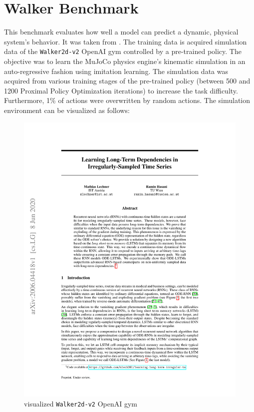 \documentclass[draft,final]{vutinfth} %
\begin{document}
    \section{Walker Benchmark} \label{walker}
    This benchmark evaluates how well a model can predict a dynamic, physical system's behavior. It was taken from \cite{ODELSTM}.
    The training data is acquired simulation data of the \texttt{Walker2d-v2} OpenAI gym \cite{OpenAIGym} controlled by a pre-trained policy.
    The objective was to learn the MuJoCo physics engine's kinematic simulation \cite{MuJoCo} in an auto-regressive fashion using imitation learning.
    The simulation data was acquired from various training stages of the pre-trained policy (between 500 and 1200 Proximal Policy Optimization iterations) to increase the task difficulty. Furthermore, 1\% of actions were overwritten by random actions.
    The simulation environment can be visualized as follows:
    \begin{figure}[H]
        \centering{}
        \includegraphics[page=7,width=0.8\linewidth,trim={340 345 105 375},clip]{literature/learning_long_term_dependencies_in_irregularly_sampled_time_series.pdf}
        \caption{visualized \texttt{Walker2d-v2} OpenAI gym \cite[p. 7]{ODELSTM}}
        \label{fig:walker2d_vis}
    \end{figure}
\end{document}
